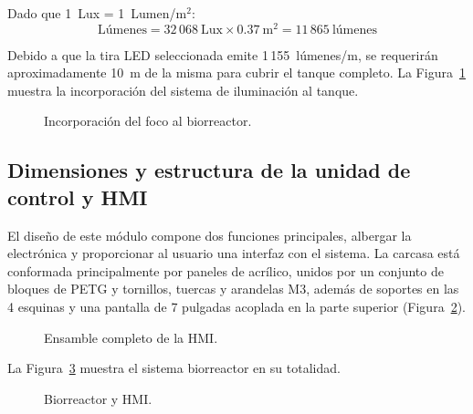\documentclass[11pt,tesis,twoside,openright,spanish]{upiiztt}
\begin{document}
Dado que 1~Lux = 1~Lumen/m$^2$:
\begin{equation}
\text{Lúmenes} = 32\,068\ \text{Lux} \times 0.37\ \text{m}^2 = 11\,865\ \text{lúmenes}
\end{equation}

Debido a que la tira LED seleccionada emite 1\,155~lúmenes/m, se requerirán
aproximadamente 10~m de la misma para cubrir el tanque completo.
La Figura~\ref{fig:foco_biorreactor} muestra la incorporación del sistema de iluminación al tanque.

\begin{figure}[H]
  \centering
  \caption{Incorporación del foco al biorreactor.}
  \label{fig:foco_biorreactor}
\end{figure}

\subsection{Dimensiones y estructura de la unidad de control y HMI}

El diseño de este módulo compone dos funciones principales, albergar la
electrónica y proporcionar al usuario una interfaz con el sistema.
La carcasa está conformada principalmente por paneles de acrílico, unidos por un
conjunto de bloques de PETG y tornillos, tuercas y arandelas M3, además de
soportes en las 4 esquinas y una pantalla de 7 pulgadas acoplada en la parte
superior (Figura~\ref{fig:hmi_ensamble}).

\begin{figure}[H]
  \centering
  \caption{Ensamble completo de la HMI.}
  \label{fig:hmi_ensamble}
\end{figure}

La Figura~\ref{fig:sistema_total} muestra el sistema biorreactor en su totalidad.

\begin{figure}[H]
  \centering
  \caption{Biorreactor y HMI.}
  \label{fig:sistema_total}
\end{figure}
\end{document}
